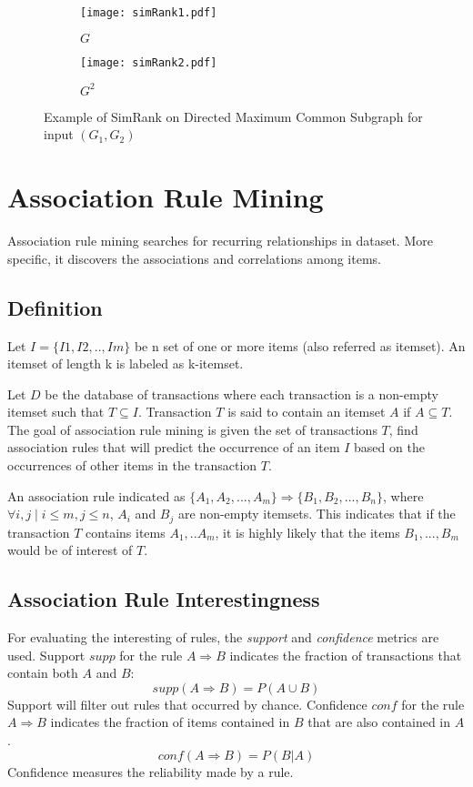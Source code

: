 \begin{figure}[t]
	\begin{subfigure}{.35\textwidth}
		\centering
		\texttt{[image: simRank1.pdf]}
		\caption{$G$}
		\label{fig:simrank1}
	\end{subfigure}%
	\begin{subfigure}{.65\textwidth}
		\centering
		\texttt{[image: simRank2.pdf]}
		\caption{$G^{2}$}
		\label{fig:simrank2}
	\end{subfigure}
	\caption{Example of SimRank on Directed Maximum Common Subgraph for input $(G_{1},G_{2})$ }
	\label{fig:simrank}
\end{figure}

\section{Association Rule Mining}
Association rule mining searches for recurring relationships in dataset.
More specific, it discovers the associations and correlations among items\cite{Han:2005:DMC:1076797}.
\subsection{Definition}
Let $I=\{I1,I2,..,Im\}$ be n set of one or more items (also referred as itemset).
An itemset of length k is labeled as k-itemset.

Let $D$ be the database of transactions where each transaction is a non-empty itemset such that $T \subseteq I$.
Transaction $T$ is said to contain an itemset $A$  if $A\subseteq T$.
The goal of association rule mining is given the set of transactions $T$, 
find association rules that will predict the occurrence of an item $I$ based on the occurrences of other items in the transaction $T$.

An association rule indicated as 
$\{A_{1},A_{2},...,A_{m}\}\Rightarrow \{B_{1},B_{2},...,B_{n}\}$, 
where $\forall i,j \mid i\leq m,j\leq n$, $A_{i}$ and $B_{j}$ are non-empty itemsets. This indicates that if the transaction $T$ contains items $A_{1},..A_{m}$, it is highly likely that the items $B_{1},...,B_{m}$ would be of interest of $T$.
\subsection{Association Rule Interestingness }
For evaluating the interesting of rules, the \emph{support} and \emph{confidence} metrics are used.
Support $supp$ for the rule $A\Rightarrow B$ indicates the fraction of transactions that contain both $A$ and $B$:
\begin{equation}
	supp(A\Rightarrow B) = P(A\cup B)
\end{equation}
Support will filter out rules that occurred by chance.
Confidence $conf$ for the rule $A\Rightarrow B$ indicates the fraction of items contained in $B$ that are also contained in $A$.
\begin{equation}
	conf(A \Rightarrow B) = P(B|A)
\end{equation}
Confidence measures the reliability made by a rule.

